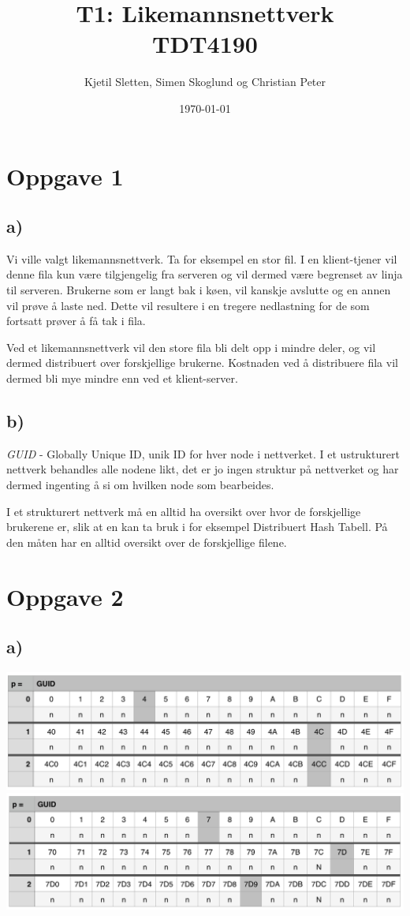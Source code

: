 \documentclass{article}
\begin{document}
\title{T1: Likemannsnettverk \\ TDT4190}
\author{Kjetil Sletten, Simen Skoglund og Christian Peter}
\date{\today}
\maketitle
\section*{Oppgave 1} 
\subsection*{a)} 
Vi ville valgt likemannsnettverk. Ta for eksempel en stor fil. I en klient-tjener vil denne fila kun være tilgjengelig fra serveren og vil dermed være begrenset av linja til serveren. Brukerne som er langt bak i køen, vil kanskje avslutte og en annen vil prøve å laste ned. Dette vil resultere i en tregere nedlastning for de som fortsatt prøver å få tak i fila.  

Ved et likemannsnettverk vil den store fila bli delt opp i mindre deler, og vil dermed distribuert over forskjellige brukerne. Kostnaden ved å distribuere fila vil dermed bli mye mindre enn ved et klient-server.
\subsection*{b)} 
\emph{GUID} - Globally Unique ID, unik ID for hver node i nettverket. I et ustrukturert nettverk behandles alle nodene likt, det er jo ingen struktur på nettverket og har dermed ingenting å si om hvilken node som bearbeides.

I et strukturert nettverk må en alltid ha oversikt over hvor de forskjellige brukerene er, slik at en kan ta bruk i for eksempel Distribuert Hash Tabell. På den måten har en alltid oversikt over de forskjellige filene.
\section*{Oppgave 2} 
\subsection*{a)} 
\begin{center}
\includegraphics[scale=0.5]{Images/4CC}
\\
\includegraphics[scale=0.5]{Images/7D9}
\end{center}
\end{document}
